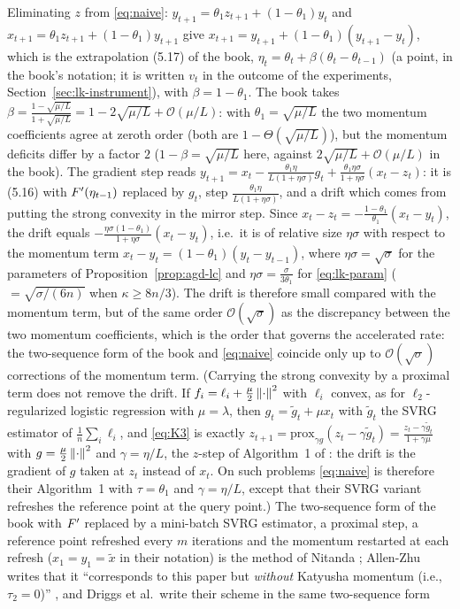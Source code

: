 \begin{remark}\label{rem:naive-book}
Eliminating $z$ from \eqref{eq:naive}: $y_{t+1}=\theta_1z_{t+1}+(1-\theta_1)y_t$ and $x_{t+1}=\theta_1z_{t+1}+(1-\theta_1)y_{t+1}$ give $x_{t+1}=y_{t+1}+(1-\theta_1)(y_{t+1}-y_t)$, which is the extrapolation (5.17) of the book, $\eta_t=\theta_t+\beta(\theta_t-\theta_{t-1})$ (a point, in the book's notation; it is written $v_t$ in the outcome of the experiments, Section~\ref{sec:lk-instrument}), with $\beta=1-\theta_1$. The book takes $\beta=\frac{1-\sqrt{\mu/L}}{1+\sqrt{\mu/L}}=1-2\sqrt{\mu/L}+\mathcal O(\mu/L)$: with $\theta_1=\sqrt{\mu/L}$ the two momentum coefficients agree at zeroth order (both are $1-\Theta(\sqrt{\mu/L})$), but the momentum deficits differ by a factor $2$ ($1-\beta=\sqrt{\mu/L}$ here, against $2\sqrt{\mu/L}+\mathcal O(\mu/L)$ in the book). The gradient step reads $y_{t+1}=x_t-\frac{\theta_1\eta}{L(1+\eta\sigma)}g_t+\frac{\theta_1\eta\sigma}{1+\eta\sigma}(x_t-z_t)$: it is (5.16) with $F'(\eta_{t-1})$ replaced by $g_t$, step $\frac{\theta_1\eta}{L(1+\eta\sigma)}$, and a drift which comes from putting the strong convexity in the mirror step. Since $x_t-z_t=-\frac{1-\theta_1}{\theta_1}(x_t-y_t)$, the drift equals $-\frac{\eta\sigma(1-\theta_1)}{1+\eta\sigma}(x_t-y_t)$, i.e.\ it is of relative size $\eta\sigma$ with respect to the momentum term $x_t-y_t=(1-\theta_1)(y_t-y_{t-1})$, where $\eta\sigma=\sqrt\sigma$ for the parameters of Proposition~\ref{prop:agd-lc} and $\eta\sigma=\frac{\sigma}{3\theta_1}$ for \eqref{eq:lk-param} ($=\sqrt{\sigma/(6n)}$ when $\kappa\ge8n/3$). The drift is therefore small compared with the momentum term, but of the same order $\mathcal O(\sqrt\sigma)$ as the discrepancy between the two momentum coefficients, which is the order that governs the accelerated rate: the two-sequence form of the book and \eqref{eq:naive} coincide only up to $\mathcal O(\sqrt\sigma)$ corrections of the momentum term. (Carrying the strong convexity by a proximal term does not remove the drift. If $f_i=\ell_i+\frac\mu2\left\|\cdot\right\|^2$ with $\ell_i$ convex, as for $\ell_2$-regularized logistic regression with $\mu=\lambda$, then $g_t=\tilde g_t+\mu x_t$ with $\tilde g_t$ the SVRG estimator of $\frac1n\sum_i\ell_i$, and \eqref{eq:K3} is exactly $z_{t+1}=\mathrm{prox}_{\gamma g}(z_t-\gamma\tilde g_t)=\frac{z_t-\gamma\tilde g_t}{1+\gamma\mu}$ with $g=\frac\mu2\left\|\cdot\right\|^2$ and $\gamma=\eta/L$, the $z$-step of Algorithm~1 of \cite{driggs2022accelerating}: the drift is the gradient of $g$ taken at $z_t$ instead of $x_t$. On such problems \eqref{eq:naive} is therefore their Algorithm~1 with $\tau=\theta_1$ and $\gamma=\eta/L$, except that their SVRG variant refreshes the reference point at the query point.) The two-sequence form of the book with $F'$ replaced by a mini-batch SVRG estimator, a proximal step, a reference point refreshed every $m$ iterations and the momentum restarted at each refresh ($x_1=y_1=\tilde x$ in their notation) is the method of Nitanda \cite{nitanda2014stochastic}; Allen-Zhu writes that it ``corresponds to this paper but \emph{without} Katyusha momentum (i.e., $\tau_2=0$)'' \cite[Appendix~A]{allenzhu2018katyusha}, and Driggs et al.\ write their scheme in the same two-sequence form 
\end{remark}
